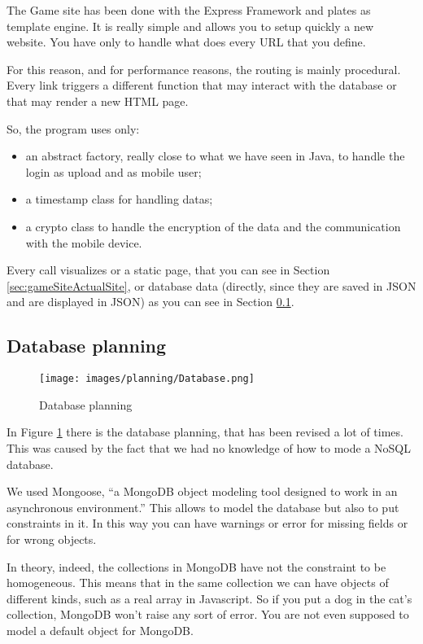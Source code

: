 The Game site has been done with the Express Framework and plates as template engine. It is really simple and allows you to setup quickly a new website. You have only to handle what does every URL that you define.

For this reason, and for performance reasons, the routing is mainly procedural. Every link triggers a different function that may interact with the database or that may render a new HTML page.

So, the program uses only:
\begin{itemize}
\item an abstract factory, really close to what we have seen in Java, to handle the login as upload and as mobile user;
\item a timestamp class for handling datas;
\item a crypto class to handle the encryption of the data and the communication with the mobile device.
\end{itemize}

Every call visualizes or a static page, that you can see in Section \ref{sec:gameSiteActualSite}, or database data (directly, since they are saved in JSON and are displayed in JSON) as you can see in Section \ref{sec:planningDatabase}.

\subsection{Database planning}
\label{sec:planningDatabase}

\begin{figure}[H]
\centering %
\texttt{[image: images/planning/Database.png]}
\caption{Database planning}
\label{fig:DatabasePlanning}
\end{figure}

In Figure \ref{fig:DatabasePlanning} there is the database planning, that has been revised a lot of times. This was caused by the fact that we had no knowledge of how to mode a NoSQL database.

We used Mongoose, ``a MongoDB object modeling tool designed to work in an asynchronous environment.'' This allows to model the database but also to put constraints in it. In this way you can have warnings or error for missing fields or for wrong objects.

In theory, indeed, the collections in MongoDB have not the constraint to be homogeneous. This means that in the same collection we can have objects of different kinds, such as a real array in Javascript. So if you put a dog in the cat's collection, MongoDB won't raise any sort of error. You are not even supposed to model a default object for MongoDB.

